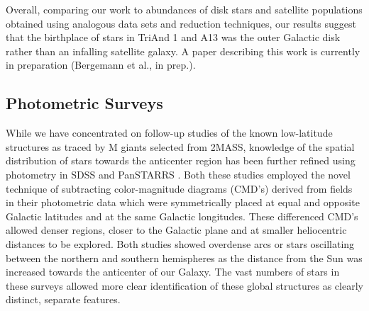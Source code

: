 \documentclass[galaxies,article,submit,moreauthors,pdftex,10pt,a4paper]{mdpi}
\begin{document}
Overall, comparing our work to abundances of disk stars and satellite populations obtained using analogous data sets and reduction techniques, our results suggest that the birthplace of stars in TriAnd 1 and A13 was the outer Galactic disk rather than an infalling satellite galaxy.
A paper describing this work is currently in preparation (Bergemann et al., in prep.).



\subsection{Photometric Surveys}

While we have concentrated on follow-up studies of the known low-latitude structures as traced by M giants selected from 2MASS, knowledge of the spatial distribution of stars towards the anticenter region has been further refined using photometry in SDSS \cite{xu15} and PanSTARRS \cite{kaiser10,lurie17}.
Both these studies employed the novel technique of subtracting color-magnitude diagrams (CMD's) derived from fields in their photometric data which were symmetrically placed at equal and opposite Galactic latitudes and at the same Galactic longitudes.
These differenced CMD's allowed denser regions, closer to the Galactic plane and at smaller heliocentric distances  to be explored.
Both studies showed overdense arcs or stars oscillating between the northern and southern hemispheres as the distance from the Sun was increased towards the anticenter of our Galaxy.
The vast numbers of stars in these surveys allowed more clear identification of these global structures as clearly distinct, separate features.




\end{document}
